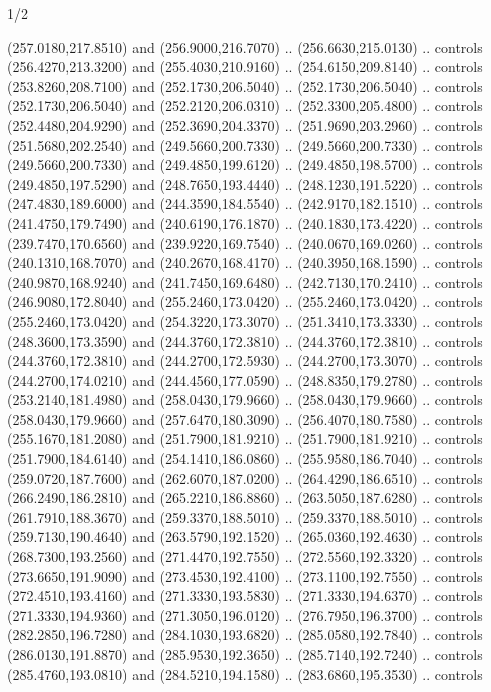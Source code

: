 \begin{flagdescription}{1/2}
\begin{scope}[xshift=0.5\flaglength]
\begin{scope}[scale=0.004\flagwidth,xshift=-90mm,yshift=89mm]
\begin{scope}[y=0.80pt, x=0.80pt, yscale=-1, xscale=1, inner sep=0pt, outer sep=0pt]
  (257.0180,217.8510) and (256.9000,216.7070) .. (256.6630,215.0130) .. controls
  (256.4270,213.3200) and (255.4030,210.9160) .. (254.6150,209.8140) .. controls
  (253.8260,208.7100) and (252.1730,206.5040) .. (252.1730,206.5040) .. controls
  (252.1730,206.5040) and (252.2120,206.0310) .. (252.3300,205.4800) .. controls
  (252.4480,204.9290) and (252.3690,204.3370) .. (251.9690,203.2960) .. controls
  (251.5680,202.2540) and (249.5660,200.7330) .. (249.5660,200.7330) .. controls
  (249.5660,200.7330) and (249.4850,199.6120) .. (249.4850,198.5700) .. controls
  (249.4850,197.5290) and (248.7650,193.4440) .. (248.1230,191.5220) .. controls
  (247.4830,189.6000) and (244.3590,184.5540) .. (242.9170,182.1510) .. controls
  (241.4750,179.7490) and (240.6190,176.1870) .. (240.1830,173.4220) .. controls
  (239.7470,170.6560) and (239.9220,169.7540) .. (240.0670,169.0260) .. controls
  (240.1310,168.7070) and (240.2670,168.4170) .. (240.3950,168.1590) .. controls
  (240.9870,168.9240) and (241.7450,169.6480) .. (242.7130,170.2410) .. controls
  (246.9080,172.8040) and (255.2460,173.0420) .. (255.2460,173.0420) .. controls
  (255.2460,173.0420) and (254.3220,173.3070) .. (251.3410,173.3330) .. controls
  (248.3600,173.3590) and (244.3760,172.3810) .. (244.3760,172.3810) .. controls
  (244.3760,172.3810) and (244.2700,172.5930) .. (244.2700,173.3070) .. controls
  (244.2700,174.0210) and (244.4560,177.0590) .. (248.8350,179.2780) .. controls
  (253.2140,181.4980) and (258.0430,179.9660) .. (258.0430,179.9660) .. controls
  (258.0430,179.9660) and (257.6470,180.3090) .. (256.4070,180.7580) .. controls
  (255.1670,181.2080) and (251.7900,181.9210) .. (251.7900,181.9210) .. controls
  (251.7900,184.6140) and (254.1410,186.0860) .. (255.9580,186.7040) .. controls
  (259.0720,187.7600) and (262.6070,187.0200) .. (264.4290,186.6510) .. controls
  (266.2490,186.2810) and (265.2210,186.8860) .. (263.5050,187.6280) .. controls
  (261.7910,188.3670) and (259.3370,188.5010) .. (259.3370,188.5010) .. controls
  (259.7130,190.4640) and (263.5790,192.1520) .. (265.0360,192.4630) .. controls
  (268.7300,193.2560) and (271.4470,192.7550) .. (272.5560,192.3320) .. controls
  (273.6650,191.9090) and (273.4530,192.4100) .. (273.1100,192.7550) .. controls
  (272.4510,193.4160) and (271.3330,193.5830) .. (271.3330,194.6370) .. controls
  (271.3330,194.9360) and (271.3050,196.0120) .. (276.7950,196.3700) .. controls
  (282.2850,196.7280) and (284.1030,193.6820) .. (285.0580,192.7840) .. controls
  (286.0130,191.8870) and (285.9530,192.3650) .. (285.7140,192.7240) .. controls
  (285.4760,193.0810) and (284.5210,194.1580) .. (283.6860,195.3530) .. controls

\end{scope}
\end{scope}
\end{scope}
\end{flagdescription}
